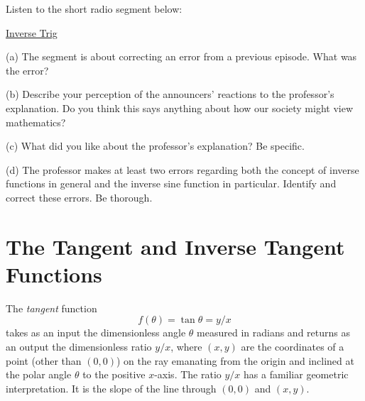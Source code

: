 \documentclass{ximera}
\begin{document}
\begin{question} \label{Q8:Inverses}

Listen to the short radio segment below:

\href{https://www.npr.org/2023/04/02/1167645463/sunday-puzzle-correction-a-
lesson-in-trigonometry}{Inverse Trig}


(a) The segment is about correcting an error from a previous episode. What was the error?


(b) Describe your perception of the announcers’ reactions to the professor’s explanation. Do you think this says anything about how our society might view mathematics?

(c) What did you like about the professor’s explanation? Be specific.

(d) The professor makes at least two errors regarding both the concept of inverse functions in general and the inverse sine function in particular. Identify and correct these errors. Be thorough.

\end{question}

\section{The Tangent and Inverse Tangent Functions}

The \emph{tangent} function 
\[
   f(\theta) = \tan \theta = y/x
\]
takes as an input the dimensionless angle $\theta$ measured in radians and returns as an output the dimensionless ratio $y/x$, where $(x,y)$ are the coordinates of a point (other than $(0,0)$) on the ray emanating from the origin and inclined at the polar angle $\theta$ to the positive $x$-axis. The ratio $y/x$ has a familiar geometric interpretation. It is the slope of the line through $(0,0)$ and $(x,y)$. 
\end{document}
